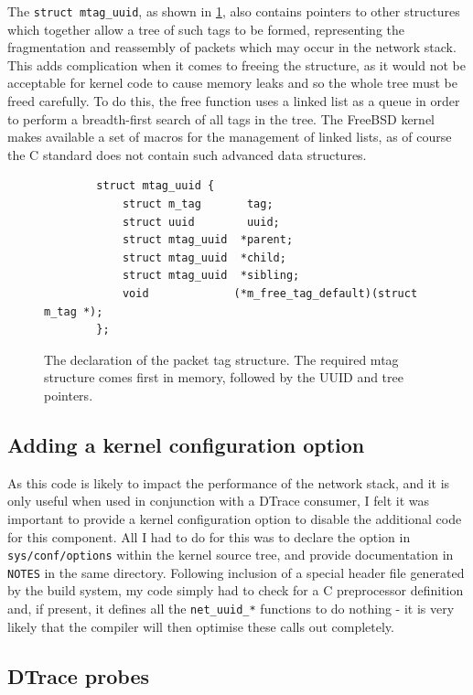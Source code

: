 \documentclass[a4paper,12pt,twoside,openright]{report}
\begin{document}
	The \verb|struct mtag_uuid|, as shown in \figurename{ \ref{fig:mtag_uuid}}, also contains pointers to other structures which together allow a tree of such tags to be formed, representing the fragmentation and reassembly of packets which may occur in the network stack. This adds complication when it comes to freeing the structure, as it would not be acceptable for kernel code to cause memory leaks and so the whole tree must be freed carefully. To do this, the free function uses a linked list as a queue in order to perform a breadth-first search of all tags in the tree. The FreeBSD kernel makes available a set of macros for the management of linked lists, as of course the C standard does not contain such advanced data structures.
	
	\begin{figure}
		\begin{verbatim}
		struct mtag_uuid {
		    struct m_tag       tag;
		    struct uuid        uuid;
		    struct mtag_uuid  *parent;
		    struct mtag_uuid  *child;
		    struct mtag_uuid  *sibling;
		    void             (*m_free_tag_default)(struct m_tag *);
		};
		\end{verbatim}
		\caption{The declaration of the packet tag structure. The required mtag structure comes first in memory, followed by the UUID and tree pointers.}
		\label{fig:mtag_uuid}
	\end{figure}
	
	\subsection{Adding a kernel configuration option}
	
	As this code is likely to impact the performance of the network stack, and it is only useful when used in conjunction with a DTrace consumer, I felt it was important to provide a kernel configuration option to disable the additional code for this component. All I had to do for this was to declare the option in \verb|sys/conf/options| within the kernel source tree, and provide documentation in \verb|NOTES| in the same directory. Following inclusion of a special header file generated by the build system, my code simply had to check for a C preprocessor definition and, if present, it defines all the \verb|net_uuid_*| functions to do nothing - it is very likely that the compiler will then optimise these calls out completely.
	
	\subsection{DTrace probes}
	
\end{document}
